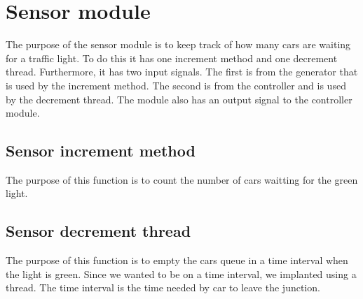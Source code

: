 \section{Sensor module}
The purpose of the sensor module is to keep track of how many cars are waiting for a traffic light. To do this it has one increment method and one decrement thread. Furthermore, it has two input signals. The first is from the generator that is used by the increment method. The second is from the controller and is used by the decrement thread. The module also has an output signal to the controller module.

\subsection{Sensor increment method}

The purpose of this function is to count the number of cars waitting for the green light. 

\subsection{Sensor decrement thread}

The purpose of this function is to empty the cars queue in a time interval when the light is green.
Since we wanted to be on a time interval, we implanted using a thread. The time interval is the time needed by car to leave the junction. 


